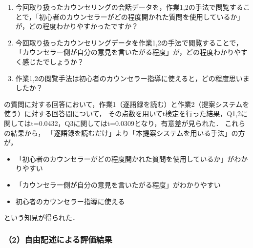 \documentclass[shuuron]{kuee}
\begin{document}
\begin{enumerate}

  \item 今回取り扱ったカウンセリングの会話データを，作業1,2の手法で閲覧することで，「初心者のカウンセラーがどの程度開かれた質問を使用しているか」が，どの程度わかりやすかったですか？
  \item 今回取り扱ったカウンセリングデータを作業1,2の手法で閲覧することで，「カウンセラー側が自分の意見を言いたがる程度」が，どの程度わかりやすく感じたでしょうか？
  \item 作業1,2の閲覧手法は初心者のカウンセラー指導に使えると，どの程度思いましたか？
\end{enumerate}
の質問に対する回答において，作業1（逐語録を読む）と作業2（提案システムを使う）に対する回答間について，
その点数を用いてt検定を行った結果，Q1,2に関してはt=0.0432，Q3に関してはt=0.0309となり，有意差が見られた．
これらの結果から，
「逐語録を読むだけ」より「本提案システムを用いる手法」の方が，
\begin{itemize}
  \item 「初心者のカウンセラーがどの程度開かれた質問を使用しているか」がわかりやすい
  \item 「カウンセラー側が自分の意見を言いたがる程度」がわかりやすい
  \item 初心者のカウンセラー指導に使える
\end{itemize}
という知見が得られた．


\subsubsection{（2）自由記述による評価結果}
%
%
%
%
%




\end{document}
